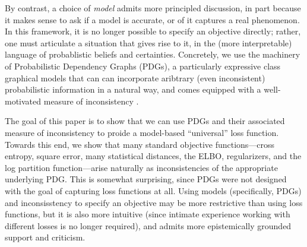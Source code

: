 \documentclass[twoside]{article}
\theoremstyle{plain}
\theoremstyle{definition}
\begin{document}
By contrast, a choice of \emph{model} admits more principled
discussion, in part because it makes sense to ask if a model is
accurate, or of it captures a real phenomenon.
In this framework, it is
no longer possible to specify an objective directly; rather, one must
articulate a situation that gives rise to it, in the (more
interpretable) language of probablistic beliefs and certainties. %
Concretely, we use the machinery of Probabilistic Dependency Graphs
(PDGs), a particularly expressive class graphical models that can can
incorporate aribtrary (even inconsistent) probabilistic information in
a natural way, and comes equipped with a well-motivated measure of
inconsistency  \cite{richardson2020probabilistic}. 


The goal of this paper is to show that we can use PDGs and their
associated measure of inconsistency to proide a model-based 
``universal'' loss function.
Towards this end, we show that many standard objective functions---cross
entropy, square error, many statistical distances, the ELBO,
regularizers, and the log partition
function---arise naturally as inconsistencies of the appropriate
underlying PDG. 
This is somewhat surprising, since PDGs were not designed with the
goal of capturing loss functions at all.
Using models (specifically, PDGs) and inconsisstency to specify an
objective  may be more restrictive than using loss functions, but
it is also more intuitive (since intimate experience working with
different losses is no longer required), and admits more epistemically
grounded support and criticism. 
\end{document}
